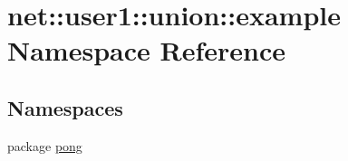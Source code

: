 \hypertarget{namespacenet_1_1user1_1_1union_1_1example}{\section{net\-:\-:user1\-:\-:union\-:\-:example \-Namespace \-Reference}
\label{namespacenet_1_1user1_1_1union_1_1example}
}
\subsection*{\-Namespaces}
\begin{DoxyCompactItemize}
\item 
package \hyperlink{namespacenet_1_1user1_1_1union_1_1example_1_1pong}{pong}
\end{DoxyCompactItemize}
